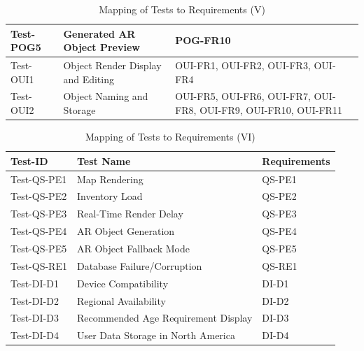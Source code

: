 \documentclass[12pt, titlepage]{article}
\begin{document}
\begin{table}[htpb!]
\begin{tabular}{|l|p{8cm}|p{3cm}|}
    \hline
    Test-POG5        & Generated AR Object Preview                           & POG-FR10                                                        \\
    \hline
    Test-OUI1        & Object Render Display and Editing                     & OUI-FR1, OUI-FR2, OUI-FR3, OUI-FR4                              \\
    \hline
    Test-OUI2        & Object Naming and Storage                             & OUI-FR5, OUI-FR6, OUI-FR7, OUI-FR8, OUI-FR9, OUI-FR10, OUI-FR11 \\
    \hline
  \end{tabular}
  \caption{Mapping of Tests to Requirements (V)}
  \label{tab:test_requirements5}
\end{table}

\begin{table}[htpb!]
  \centering
  \begin{tabular}{|l|p{8cm}|p{3cm}|}
    \hline
    \textbf{Test-ID} & \textbf{Test Name}                  & \textbf{Requirements} \\
    \hline
    Test-QS-PE1      & Map Rendering                       & QS-PE1                \\
    \hline
    Test-QS-PE2      & Inventory Load                      & QS-PE2                \\
    \hline
    Test-QS-PE3      & Real-Time Render Delay              & QS-PE3                \\
    \hline
    Test-QS-PE4      & AR Object Generation                & QS-PE4                \\
    \hline
    Test-QS-PE5      & AR Object Fallback Mode             & QS-PE5                \\
    \hline
    Test-QS-RE1      & Database Failure/Corruption         & QS-RE1                \\
    \hline
    Test-DI-D1       & Device Compatibility                & DI-D1                 \\
    \hline
    Test-DI-D2       & Regional Availability               & DI-D2                 \\
    \hline
    Test-DI-D3       & Recommended Age Requirement Display & DI-D3                 \\
    \hline
    Test-DI-D4       & User Data Storage in North America  & DI-D4                 \\
    \hline
  \end{tabular}
  \caption{Mapping of Tests to Requirements (VI)}
  \label{tab:test_requirements6}
\end{table}
\pagebreak
\end{document}
